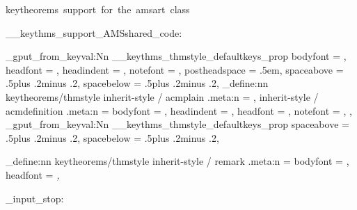   {keytheorems~support~for~the~amsart~class}

\__keythms_support_AMSshared_code:

  { %
    \prop_gput_from_keyval:Nn \g__keythms_thmstyle_defaultkeys_prop
      {
        bodyfont      = \@acmplainbodyfont,
        headfont      = \@acmplainheadfont,
        headindent    = \@acmplainindent,
        notefont      = \@acmplainnotefont,
        postheadspace = .5em,
        spaceabove    = .5\baselineskip plus .2\baselineskip minus .2\baselineskip,
        spacebelow    = .5\baselineskip plus .2\baselineskip minus .2\baselineskip,
      }
    \keys_define:nn { keytheorems/thmstyle }
      {
        inherit-style / acmplain      .meta:n = {},
        inherit-style / acmdefinition .meta:n =
          {
            bodyfont   = \@acmdefinitionbodyfont,
            headindent = \@acmdefinitionindent,
            headfont   = \@acmdefinitionheadfont,
            notefont   = \@acmdefinitionnotefont,
          },
      }
  }
  {
    \prop_gput_from_keyval:Nn \g__keythms_thmstyle_defaultkeys_prop
      {
        spaceabove = .5\baselineskip plus .2\baselineskip minus .2\baselineskip,
        spacebelow = .5\baselineskip plus .2\baselineskip minus .2\baselineskip,
      }
  }

\keys_define:nn { keytheorems/thmstyle }
  {
    inherit-style / remark .meta:n =
      {
        bodyfont = \normalfont,
        headfont = \itshape,
      }
  }

\file_input_stop: